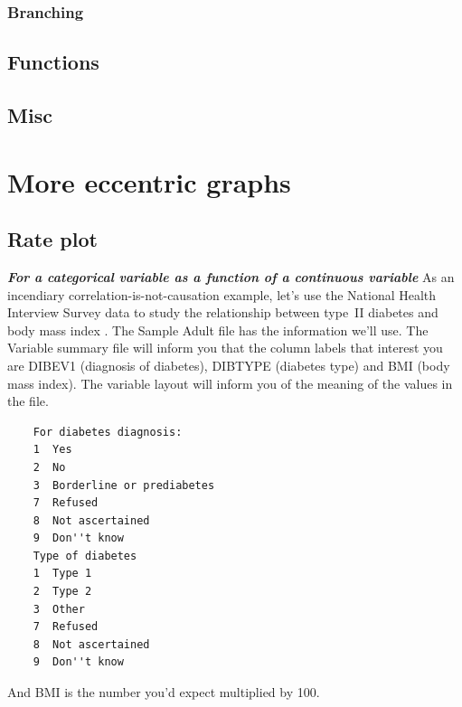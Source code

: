 \documentclass{report}
\newcommand{\notefor}[1]{\hfill\textbf{\textit{#1}}}
\begin{document}
		\subsection{Branching}\label{subsec:branching}
	\section{Functions}
	\section{Misc}
	
\chapter{More eccentric graphs}
	\section{Rate plot}\label{sec:cdplot}
	\notefor{For a categorical variable as a function of a continuous variable}
	As an incendiary correlation-is-not-causation example, let's use the National Health Interview Survey data to study the relationship between type~II diabetes and body mass index \cite{nhis}. The Sample Adult file has the information we'll use. The Variable summary file will inform you that the column labels that interest you are DIBEV1 (diagnosis of diabetes), DIBTYPE (diabetes type) and BMI (body mass index). The variable layout will inform you of the meaning of the values in the file.
	\begin{verbatim}
	For diabetes diagnosis: 
	1  Yes
	2  No
	3  Borderline or prediabetes
	7  Refused
	8  Not ascertained
	9  Don''t know 
	Type of diabetes
	1  Type 1
	2  Type 2
	3  Other
	7  Refused
	8  Not ascertained
	9  Don''t know 
	\end{verbatim}
	And BMI is the number you'd expect multiplied by 100.
	
\end{document}
